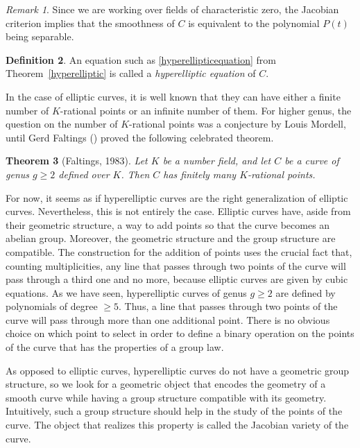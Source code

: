 \documentclass[a4paper, 12pt]{amsart}
\theoremstyle{definition}
\newtheorem{defn0}{Definition}[section]
\theoremstyle{plain}
\theoremstyle{plain}
\newtheorem{thm0}[defn0]{Theorem}
\theoremstyle{plain}
\theoremstyle{plain}
\theoremstyle{remark}
\theoremstyle{remark}
\newtheorem{remark0}[defn0]{Remark}
\theoremstyle{plain}
\newenvironment{definition}{ \begin{defn0}}{\end{defn0}}
\newenvironment{theorem}{ \begin{thm0}}{\end{thm0}}
\newenvironment{remark}{ \begin{remark0}\rm}{\end{remark0}}
\newcommand{\thmref}[1]{Theorem~\ref{#1}}
\begin{document}
	\begin{remark}
		Since we are working over fields of characteristic zero, the Jacobian criterion implies that the smoothness of $C$ is equivalent to the polynomial $P(t)$ being separable.
	\end{remark}
	\begin{definition}
		An equation such as \ref{hyperellipticequation} from \thmref{hyperelliptic} is called a \emph{hyperelliptic equation} of $C$.
	\end{definition}
	
	In the case of elliptic curves, it is well known that they can have either a finite number of $K$-rational points or an infinite number of them. For higher genus, the question on the number of $K$-rational points was a conjecture by Louis Mordell, until Gerd Faltings (\cite{Faltings_1983}) proved the following celebrated theorem.
	\begin{theorem}[Faltings, 1983]
		Let $K$ be a number field, and let $C$ be a curve of genus $g\ge 2$ defined over $K$. Then $C$ has finitely many $K$-rational points.
	\end{theorem}
	
	For now, it seems as if hyperelliptic curves are the right generalization of elliptic curves. Nevertheless, this is not entirely the case. Elliptic curves have, aside from their geometric structure, a way to add points so that the curve becomes an abelian group. Moreover, the geometric structure and the group structure are compatible. The construction for the addition of points uses the crucial fact that, counting multiplicities, any line that passes through two points of the curve will pass through a third one and no more, because elliptic curves are given by cubic equations. As we have seen, hyperelliptic curves of genus $g\ge 2$ are defined by polynomials of degree $\ge 5$. Thus, a line that passes through two points of the curve will pass through more than one additional point. There is no obvious choice on which point to select in order to define a binary operation on the points of the curve that has the properties of a group law.
	
	As opposed to elliptic curves, hyperelliptic curves do not have a geometric group structure, so we look for a geometric object that encodes the geometry of a smooth curve while having a group structure compatible with its geometry. Intuitively, such a group structure should help in the study of the points of the curve. The object that realizes this property is called the Jacobian variety of the curve.
	
\end{document}
